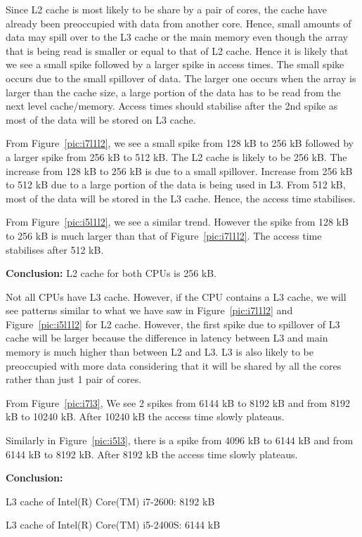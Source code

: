 \documentclass{article}
\begin{document}
Since L2 cache is most likely to be share by a pair of cores, the cache have already been preoccupied with data from another core. Hence, small amounts of data may spill over to the L3 cache or the main memory even though the array that is being read is smaller or equal to that of L2 cache. Hence it is likely that we see a small spike followed by a larger spike in access times. The small spike occurs due to the small spillover of data. The larger one occurs when the array is larger than the cache size, a large portion of the data has to be read from the next level cache/memory. Access times should stabilise after the 2nd spike as most of the data will be stored on L3 cache.

From Figure~\ref{pic:i7l1l2}, we see a small spike from 128 kB to 256 kB followed by a larger spike from 256 kB to 512 kB. The L2 cache is likely to be 256 kB. The increase from 128 kB to 256 kB is due to a small spillover. Increase from 256 kB to 512 kB due to a large portion of the data is being used in L3. From 512 kB, most of the data will be stored in the L3 cache. Hence, the access time stabilises.

From Figure~\ref{pic:i5l1l2}, we see a similar trend. However the spike from 128 kB to 256 kB is much larger than that of Figure~\ref{pic:i7l1l2}. The access time stabilises after 512 kB.
\begin{list}{•}{•}
\item \textbf{Conclusion:} L2 cache for both CPUs is 256 kB.
\end{list}

Not all CPUs have L3 cache. However, if the CPU contains a L3 cache, we will see patterns similar to what we have saw in Figure~\ref{pic:i7l1l2} and Figure~\ref{pic:i5l1l2} for L2 cache. However, the first spike due to spillover of L3 cache will be larger because the difference in latency between L3 and main memory is much higher than between L2 and L3. L3 is also likely to be preoccupied with more data considering that it will be shared by all the cores rather than just 1 pair of cores. 

From Figure~\ref{pic:i7l3}, We see 2 spikes from 6144 kB to 8192 kB and from 8192 kB to 10240 kB. After 10240 kB the access time slowly plateaus.

Similarly in Figure~\ref{pic:i5l3}, there is a spike from 4096 kB to 6144 kB and from 6144 kB to 8192 kB. After 8192 kB the access time slowly plateaus.
\begin{list}{•}{•}
\item \textbf{Conclusion:} 
	\begin{list}{•}{•}
			\item L3 cache of Intel(R) Core(TM) i7-2600: 8192 kB
		\item L3 cache of Intel(R) Core(TM) i5-2400S: 6144 kB
	\end{list}
\end{list}
\end{document}

